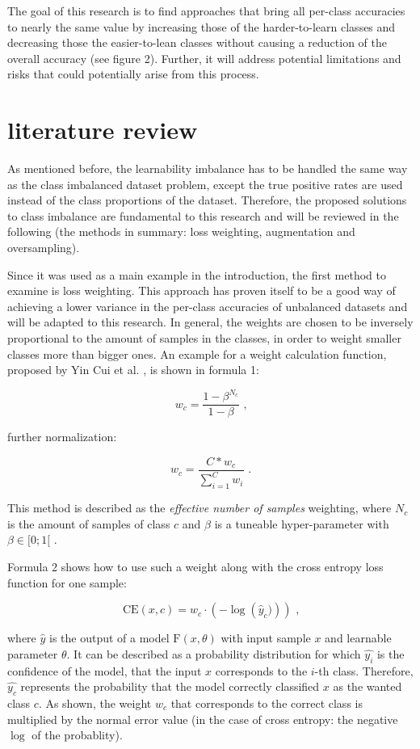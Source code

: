 \documentclass[journal]{IEEEtran}
\begin{document}
The goal of this research is to find approaches that bring all per-class accuracies to nearly the same value by increasing those of the harder-to-learn classes
and decreasing those the easier-to-lean classes without causing a reduction of the overall accuracy (see figure 2).
Further, it will address potential limitations and risks that could potentially arise from this process.

\section{literature review}
As mentioned before, the learnability imbalance has to be handled the same way as the class imbalanced dataset problem, except the true positive rates are used instead of the class proportions of the dataset.
Therefore, the proposed solutions to class imbalance are fundamental to this research and will be reviewed in the following (the methods in summary: loss weighting, augmentation and oversampling).

Since it was used as a main example in the introduction, the first method to examine is loss weighting. 
This approach has proven itself to be a good way of achieving a lower variance in the per-class accuracies of unbalanced datasets and will be adapted to this research. 
In general, the weights are chosen to be inversely proportional to the amount of samples in the classes, in order to weight smaller classes more than bigger ones. 
An example for a weight calculation function, proposed by Yin Cui et al. \cite{cui2019class}, is shown in formula 1:

\[ w_c = \frac{1-\beta^{N_c}}{1-\beta} \text{ ,} \]

further normalization:

\[ w_c = \frac{C * w_c}{\sum_{i=1}^{C}w_i} \text{ .} \]

This method is described as the \emph{effective number of samples} weighting, where $N_c$ is the amount of samples of class $c$ and $\beta$ is a tuneable hyper-parameter with $\beta \in [0;1[$ .

Formula 2 shows how to use such a weight along with the cross entropy loss function for one sample:

\[ \text{CE}(x, c) = w_{c} \cdot \left(-\log\left(\hat{y}_c)\right) \right) \text{ ,} \]

where $\hat{y}$ is the output of a model $\text{F}(x, \theta)$ with input sample $x$ and learnable parameter $\theta$. 
It can be described as a probability distribution for which $\hat{y_i}$ is the confidence of the model, that the input $x$ corresponds to the $i$-th class.
Therefore, $\hat{y_c}$ represents the probability that the model correctly classified $x$ as the wanted class $c$. 
As shown, the weight $w_c$ that corresponds to the correct class is multiplied by the normal error value (in the case of cross entropy: the negative $\log$ of the probablity).
\end{document}

